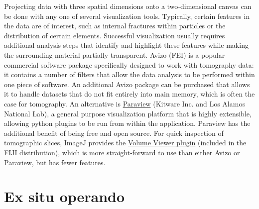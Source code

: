 \documentclass[journal=cmatex,manuscript=perspective]{achemso}
\begin{document}
Projecting data with three spatial dimensions onto a two-dimensional
canvas can be done with any one of several visualization
tools. Typically, certain features in the data are of interest, such
as internal fractures within particles or the distribution of certain
elements. Successful visualization usually requires additional
analysis steps that identify and highlight these features while making
the surrounding material partially transparent. Avizo (FEI) is a
popular commercial software package specifically designed to work with
tomography data: it contains a number of filters that allow the data
analysis to be performed within one piece of software. An additional
Avizo package can be purchased that allows it to handle datasets that
do not fit entirely into main memory, which is often the case for
tomography. An alternative is
\href{http://www.paraview.org/}{Paraview} (Kitware Inc. and Los Alamos
National Lab), a general purpose visualization platform that is highly
extensible, allowing python plugins to be run from within the
application. Paraview has the additional benefit of being free and
open source. For quick inspection of tomographic slices, ImageJ
provides the
\href{https://imagej.nih.gov/ij/plugins/volume-viewer.html}{Volume
  Viewer plugin} (included in the \href{http://imagej.net/Fiji}{FIJI
  distribution}), which is more straight-forward to use than either
Avizo or Paraview, but has fewer features.

\section{Ex situ  operando}
\end{document}
